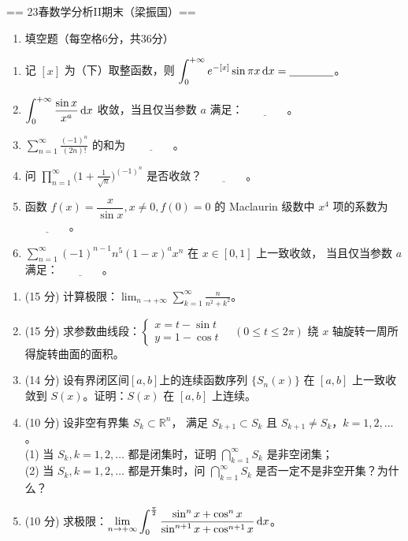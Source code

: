 == 23春数学分析II期末（梁振国）==
\begin{enumerate}
\item 填空题（每空格6分，共36分）
\end{enumerate}
\begin{enumerate}[label=(\arabic*)]
\item 记 $[x]$ 为（下）取整函数，则 $\displaystyle\int_0^{+\infty} e^{-[x]}\sin\pi x\,{\rm d}x=\underline{\qquad\qquad}$。
\item $\displaystyle\int_0^{+\infty} \frac{\sin x}{x^a}\,{\rm d}x$ 收敛，当且仅当参数 $a$ 满足：$\underline{\qquad\qquad}$。
\item $\displaystyle\sum_{n=1}^{\infty} \frac{(-1)^n}{(2 n)!}$ 的和为 $\underline{\qquad\qquad}$。
\item 问 $\displaystyle\prod_{n=1}^{\infty}\Big(1+\frac{1}{\sqrt{n}}\Big)^{(-1)^n}$ 是否收敛？$\underline{\qquad\qquad}$。
\item 函数 $f(x)=\dfrac{x}{\sin x}, x \neq 0, f(0)=0$ 的 Maclaurin 级数中 $x^4$ 项的系数为 $\underline{\qquad\qquad}$。
\item $\displaystyle\sum_{n=1}^{\infty}(-1)^{n-1} n^5(1-x)^a x^n$ 在 $x \in[0,1]$ 上一致收敛，
当且仅当参数 $a$ 满足：$\underline{\qquad\qquad}$。
\end{enumerate}
\begin{enumerate}
\item (15 分) 计算极限：$\displaystyle\lim_{n \rightarrow+\infty} \sum_{k=1}^{\infty} \frac{n}{n^2+k^2}$。

\item (15 分) 求参数曲线段：$\begin{cases}x=t-\sin t \\ y=1-\cos t\end{cases} \quad(0 \leq t \leq 2 \pi)$ 绕 $x$ 轴旋转一周所得旋转曲面的面积。

\item (14 分) 设有界闭区间$[a,b]$上的连续函数序列 $\{S_n(x)\}$ 
在 $[a,b]$ 上一致收敛到 $S(x)$。证明：$S(x)$ 在 $[a,b]$ 上连续。

\item (10 分) 设非空有界集 $S_k \subset \mathbb{R}^n$，
满足 $S_{k+1} \subset S_k$ 且 $S_{k+1} \neq S_k$，$k=1,2,\ldots$。\\
(1) 当 $S_k,k=1,2,\ldots$ 都是闭集时，证明 $\displaystyle\bigcap_{k=1}^{\infty} S_k$ 是非空闭集；\\
(2) 当 $S_k,k=1,2,\ldots$ 都是开集时，问 $\displaystyle\bigcap_{k=1}^{\infty} S_k$ 是否一定不是非空开集？为什么？

\item (10 分) 求极限：$\displaystyle\lim_{n \rightarrow+\infty} \int_0^{\frac{\pi}{2}} \frac{\sin^n x+\cos^n x}{\sin^{n+1} x+\cos^{n+1} x}\,{\rm d}x$。
\end{enumerate}

